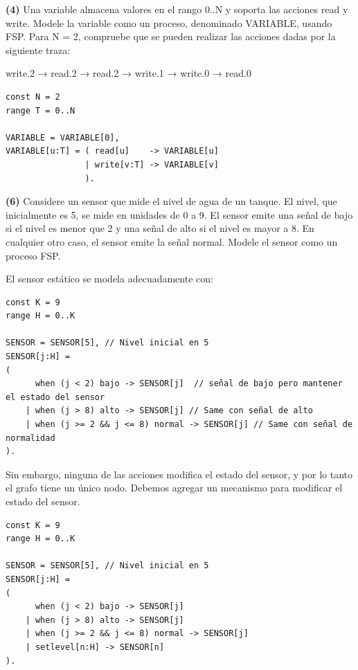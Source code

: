 \documentclass[a4paper, 12pt]{article}
\begin{document}
\pagebreak 

\begin{myframe}
    \textbf{(4)} Una variable almacena valores en el rango 0..N y soporta las
    acciones read y write. Modele la variable como un proceso, denominado
    VARIABLE, usando FSP. Para N = 2, compruebe que se pueden realizar las
    acciones dadas por la siguiente traza:

    write.2 → read.2 → read.2 → write.1 → write.0 → read.0
\end{myframe}


\begin{verbatim}
const N = 2
range T = 0..N

VARIABLE = VARIABLE[0],
VARIABLE[u:T] = ( read[u]    -> VARIABLE[u]
                | write[v:T] -> VARIABLE[v]
                ).
\end{verbatim}

\pagebreak 

\begin{myframe}
    \textbf{(6)} Considere un sensor que mide el nivel de agua de un tanque. El
    nivel, que inicialmente es 5, se mide en unidades de 0 a 9. El sensor emite
    una señal de bajo si el nivel es menor que 2 y una señal de alto si el nivel
    es mayor a 8. En cualquier otro caso, el sensor emite la señal normal.
    Modele el sensor como un proceso FSP.
\end{myframe}

El sensor estático se modela adecuadamente con:

\begin{verbatim}
const K = 9 
range H = 0..K

SENSOR = SENSOR[5], // Nivel inicial en 5
SENSOR[j:H] =  
(
	  when (j < 2) bajo -> SENSOR[j]  // señal de bajo pero mantener el estado del sensor
	| when (j > 8) alto -> SENSOR[j] // Same con señal de alto
	| when (j >= 2 && j <= 8) normal -> SENSOR[j] // Same con señal de normalidad
).
\end{verbatim}

Sin embargo, ninguna de las acciones modifica el estado del sensor, y por lo
tanto el grafo tiene un único nodo. Debemos agregar un mecanismo para modificar
el estado del sensor.

\begin{verbatim}
const K = 9 
range H = 0..K

SENSOR = SENSOR[5], // Nivel inicial en 5
SENSOR[j:H] =  
(
	  when (j < 2) bajo -> SENSOR[j]  
	| when (j > 8) alto -> SENSOR[j] 
	| when (j >= 2 && j <= 8) normal -> SENSOR[j] 
    | setlevel[n:H] -> SENSOR[n]
).
\end{verbatim}
\end{document}
